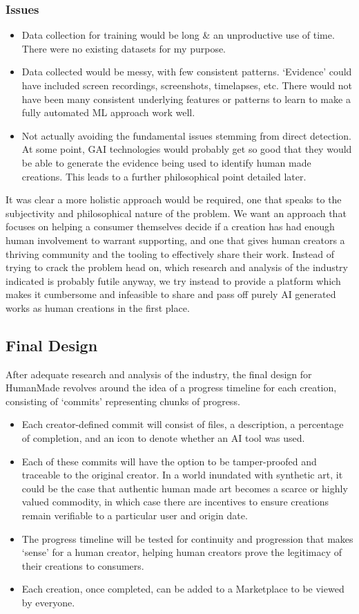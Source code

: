 \documentclass[12pt,a4paper]{article}
\begin{document}
\subsubsection{Issues}
\begin{itemize}
    \item Data collection for training would be long \& an unproductive use of time. There were no existing datasets for my purpose.
    \item Data collected would be messy, with few consistent patterns. `Evidence' could have included screen recordings, screenshots, timelapses, etc. There would not have been many consistent underlying features or patterns to learn to make a fully automated ML approach work well.
    \item Not actually avoiding the fundamental issues stemming from direct detection. At some point, GAI technologies would probably get so good that they would be able to generate the evidence being used to identify human made creations. This leads to a further philosophical point detailed later.
\end{itemize}
It was clear a more holistic approach would be required, one that speaks to the subjectivity and philosophical nature of the problem. We want an approach that focuses on helping a consumer themselves decide if a creation has had enough human involvement to warrant supporting, and one that gives human creators a thriving community and the tooling to effectively share their work. Instead of trying to crack the problem head on, which research and analysis of the industry indicated is probably futile anyway, we try instead to provide a platform which makes it cumbersome and infeasible to share and pass off purely AI generated works as human creations in the first place.
\subsection{Final Design}
After adequate research and analysis of the industry, the final design for HumanMade revolves around the idea of a progress timeline for each creation, consisting of `commits' representing chunks of progress.
\begin{itemize}
    \item Each creator-defined commit will consist of files, a description, a percentage of completion, and an icon to denote whether an AI tool was used.
    \item Each of these commits will have the option to be tamper-proofed and traceable to the original creator. In a world inundated with synthetic art, it could be the case that authentic human made art becomes a scarce or highly valued commodity, in which case there are incentives to ensure creations remain verifiable to a particular user and origin date. 
    \item The progress timeline will be tested for continuity and progression that makes `sense' for a human creator, helping human creators prove the legitimacy of their creations to consumers.
    \item Each creation, once completed, can be added to a Marketplace to be viewed by everyone.
\end{itemize}
\end{document}
